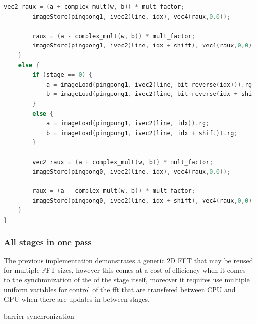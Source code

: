 \documentclass[
  oneside,
  11pt, a4paper,
  footinclude=true,
  headinclude=true,
  cleardoublepage=empty
]{scrbook}
\begin{document}
\begin{lstlisting}[language=C,caption={FFT Cooley-Tukey Vertical},label={lst:ct-vertical}]
        vec2 raux = (a + complex_mult(w, b)) * mult_factor;
        imageStore(pingpong1, ivec2(line, idx), vec4(raux,0,0));
            
        raux = (a - complex_mult(w, b)) * mult_factor;
        imageStore(pingpong1, ivec2(line, idx + shift), vec4(raux,0,0));
    }
    else {
        if (stage == 0) {
            a = imageLoad(pingpong1, ivec2(line, bit_reverse(idx))).rg;
            b = imageLoad(pingpong1, ivec2(line, bit_reverse(idx + shift))).rg;
        }
        else {	
            a = imageLoad(pingpong1, ivec2(line, idx)).rg;
            b = imageLoad(pingpong1, ivec2(line, idx + shift)).rg;
        }

        vec2 raux = (a + complex_mult(w, b)) * mult_factor;
        imageStore(pingpong0, ivec2(line, idx), vec4(raux,0,0));
            
        raux = (a - complex_mult(w, b)) * mult_factor;
        imageStore(pingpong0, ivec2(line, idx + shift), vec4(raux,0,0));
    }
}
\end{lstlisting}

\subsubsection{All stages in one pass}

The previous implementation demonstrates a generic 2D FFT that may be reused for multiple FFT sizes, however this comes at a cost of efficiency when it comes to the synchronization of the of the stage itself, moreover it requires use multiple uniform variables for control of the fft that are transfered between CPU and GPU when there are updates in between stages.
\newline


barrier synchronization \citep{stuart2011efficient}



\end{document}
